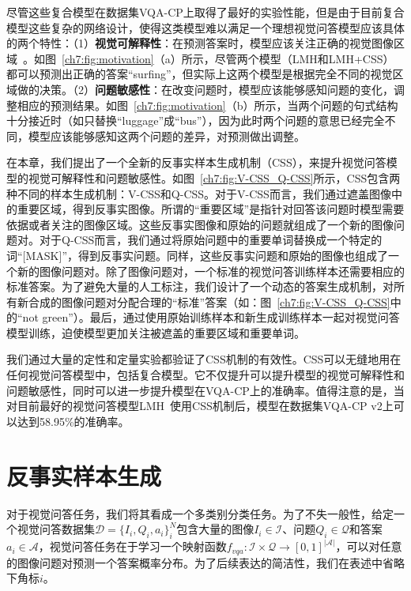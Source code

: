 尽管这些复合模型在数据集VQA-CP上取得了最好的实验性能，但是由于目前复合模型这些复杂的网络设计，使得这类模型难以满足一个理想视觉问答模型应该具体的两个特性：（1）\textbf{视觉可解释性}：在预测答案时，模型应该关注正确的视觉图像区域~\cite{ross2017right}。如图~\ref{ch7:fig:motivation}（a）所示，尽管两个模型（LMH和LMH+CSS）都可以预测出正确的答案“surfing”，但实际上这两个模型是根据完全不同的视觉区域做的决策。（2）\textbf{问题敏感性}：在改变问题时，模型应该能够感知问题的变化，调整相应的预测结果。如图~\ref{ch7:fig:motivation}（b）所示，当两个问题的句式结构十分接近时（如只替换“luggage”成“bus”），因为此时两个问题的意思已经完全不同，模型应该能够感知这两个问题的差异，对预测做出调整。

在本章，我们提出了一个全新的反事实样本生成机制（CSS），来提升视觉问答模型的视觉可解释性和问题敏感性。如图~\ref{ch7:fig:V-CSS_Q-CSS}所示，CSS包含两种不同的样本生成机制：V-CSS和Q-CSS。对于V-CSS而言，我们通过遮盖图像中的重要区域，得到反事实图像。所谓的“重要区域”是指针对回答该问题时模型需要依据或者关注的图像区域。这些反事实图像和原始的问题就组成了一个新的图像问题对。对于Q-CSS而言，我们通过将原始问题中的重要单词替换成一个特定的词“[MASK]”，得到反事实问题。同样，这些反事实问题和原始的图像也组成了一个新的图像问题对。除了图像问题对，一个标准的视觉问答训练样本还需要相应的标准答案。为了避免大量的人工标注，我们设计了一个动态的答案生成机制，对所有新合成的图像问题对分配合理的“标准”答案（如：图~\ref{ch7:fig:V-CSS_Q-CSS}中的“not green”）。最后，通过使用原始训练样本和新生成训练样本一起对视觉问答模型训练，迫使模型更加关注被遮盖的重要区域和重要单词。

我们通过大量的定性和定量实验都验证了CSS机制的有效性。CSS可以无缝地用在任何视觉问答模型中，包括复合模型。它不仅提升可以提升模型的视觉可解释性和问题敏感性，同时可以进一步提升模型在VQA-CP上的准确率。值得注意的是，当对目前最好的视觉问答模型LMH~\cite{clark2019don}使用CSS机制后，模型在数据集VQA-CP v2上可以达到58.95\%的准确率。


\section{反事实样本生成}

对于视觉问答任务，我们将其看成一个多类别分类任务。为了不失一般性，给定一个视觉问答数据集$\mathcal{D} = \{I_i, Q_i, a_i \}^N_i$包含大量的图像$I_i \in \mathcal{I}$、问题$Q_i \in \mathcal{Q}$和答案$a_i \in \mathcal{A}$，视觉问答任务在于学习一个映射函数$f_{vqa}: \mathcal{I} \times \mathcal{Q} \rightarrow [0, 1]^{|\mathcal{A}|}$，可以对任意的图像问题对预测一个答案概率分布。为了后续表达的简洁性，我们在表述中省略下角标$i$。


